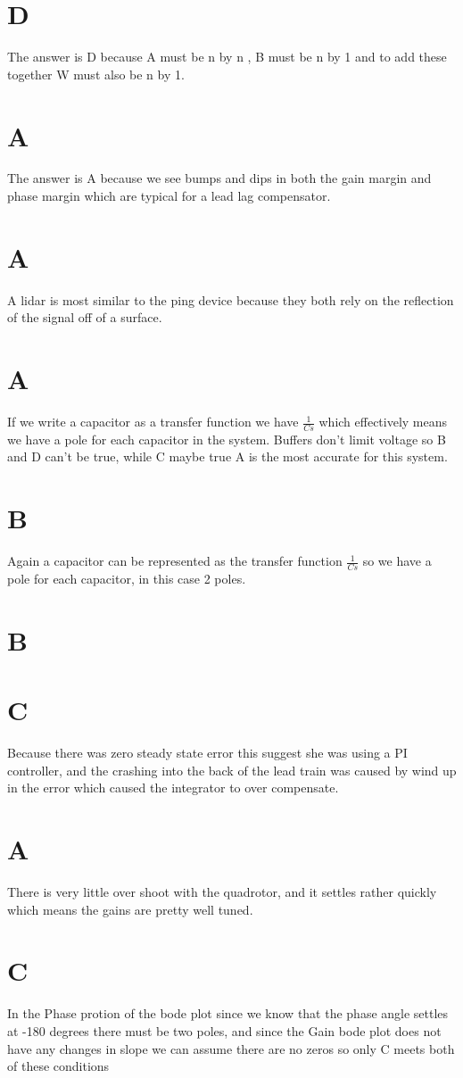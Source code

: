 \documentclass[11pt,english]{article}
\begin{document}
\section{D} 
The answer is D because A must be n by n , B must be  n by 1 and to add these together W must also be n by 1. 

\section{A} 
The answer is A because we see bumps and dips in both the gain margin and phase margin which are typical for a lead lag compensator. 
\section{A} 
A lidar is most similar to the ping device because they both rely on the reflection of the signal off of a surface. 
\section{A} 
If we write a capacitor as a transfer function we have 
$ \frac{1}{Cs} $ which effectively means we have a pole for each capacitor in the system. Buffers don't limit voltage so B and D can't be true, while C maybe true  A is the most accurate for this system.  
\section{B} 
Again a capacitor can be represented as the transfer function $ \frac{1}{Cs} $ so we have a pole for each capacitor, in this case 2 poles. 
\section{B} 
\section{C}
Because there was zero steady state error this suggest she was using a PI controller, and the crashing into the back of the lead train was caused by wind up in the error which caused the integrator to over compensate.
\section{A} 
There is very little over shoot with the quadrotor, and it settles rather quickly which means the gains are pretty well tuned. 
\section{C}
In the Phase protion of the bode plot since we know that the phase angle settles at -180 degrees there must be two poles, and since the Gain bode plot does not have any changes in slope we can assume there are no zeros so only C meets both of these conditions 
\end{document}
